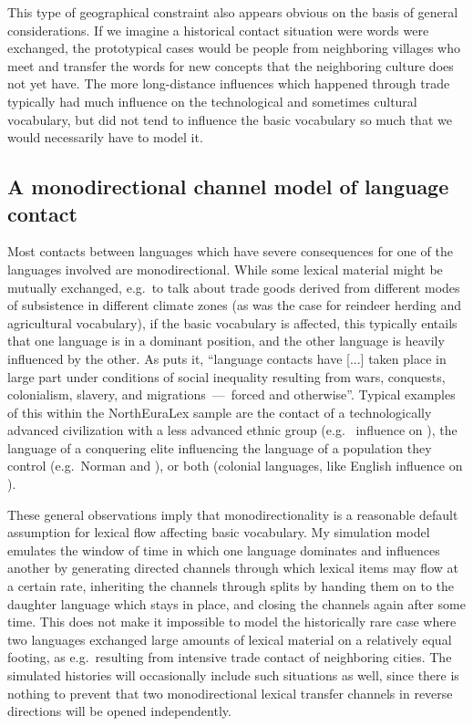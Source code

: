 This type of geographical constraint also appears obvious on the basis of general considerations. If we imagine a historical contact situation were words were exchanged, the prototypical cases would be people from neighboring villages who meet and transfer the words for new concepts that the neighboring culture does not yet have. The more long-distance influences which happened through trade typically had much influence on the technological and sometimes cultural vocabulary, but did not tend to influence the basic vocabulary so much that we would necessarily have to model it.

\subsection{A monodirectional channel model of language contact}
Most contacts between languages which have severe consequences for one of the languages involved are monodirectional. While some lexical material might be mutually exchanged, e.g.\ to talk about trade goods derived from different modes of subsistence in different climate zones (as was the case for  reindeer herding and  agricultural vocabulary), if the basic vocabulary is affected, this typically entails that one language is in a dominant position, and the other language is heavily influenced by the other. As \cite{sankoff2001} puts it, ``language contacts have [...] taken place in large part under conditions of social inequality resulting from wars, conquests, colonialism, slavery, and migrations~---~forced and otherwise''. Typical examples of this within the NorthEuraLex sample are the contact of a technologically advanced civilization with a less advanced ethnic group (e.g.\  influence on ), the language of a conquering elite influencing the language of a population they control (e.g.\ Norman  and ), or both (colonial languages, like English influence on ).

These general observations imply that monodirectionality is a reasonable default assumption for lexical flow affecting basic vocabulary. My simulation model emulates the window of time in which one language dominates and influences another by generating directed channels through which lexical items may flow at a certain rate, inheriting the channels through splits by handing them on to the daughter language which stays in place, and closing the channels again after some time. This does not make it impossible to model the historically rare case where two languages exchanged large amounts of lexical material on a relatively equal footing, as e.g.\ resulting from intensive trade contact of neighboring cities. The simulated histories will occasionally include such situations as well, since there is nothing to prevent that two monodirectional lexical transfer channels in reverse directions will be opened independently.


